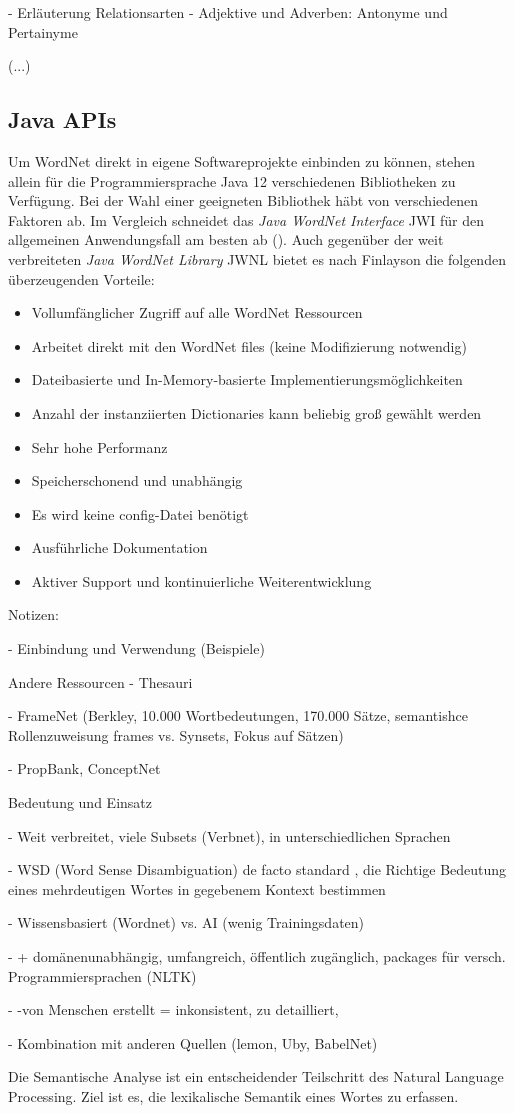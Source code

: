 - Erläuterung Relationsarten
- Adjektive und Adverben: Antonyme und Pertainyme

(...)

\subsection{Java APIs}

Um WordNet direkt in eigene Softwareprojekte einbinden zu können, stehen allein für die Programmiersprache Java 12 verschiedenen Bibliotheken zu Verfügung. Bei der Wahl einer geeigneten Bibliothek häbt von verschiedenen Faktoren ab. Im Vergleich schneidet das \textit{Java WordNet Interface} \ac{JWI} für den allgemeinen Anwendungsfall am besten ab (\cite[vgl.][2]{FINLAYSON}). Auch gegenüber der weit verbreiteten \textit{Java WordNet Library} \ac{JWNL} bietet es nach Finlayson die folgenden überzeugenden Vorteile:

\begin{itemize} 
\item Vollumfänglicher Zugriff auf alle WordNet Ressourcen
\item Arbeitet direkt mit den WordNet files (keine Modifizierung notwendig)
\item Dateibasierte und In-Memory-basierte Implementierungsmöglichkeiten
\item Anzahl der instanziierten Dictionaries kann beliebig groß gewählt werden
\item Sehr hohe Performanz
\item Speicherschonend und unabhängig
\item Es wird keine config-Datei benötigt 
\item Ausführliche Dokumentation
\item Aktiver Support und kontinuierliche Weiterentwicklung
\end{itemize}


Notizen:

- Einbindung und Verwendung (Beispiele)

Andere Ressourcen
-	Thesauri

-	FrameNet (Berkley, 10.000 Wortbedeutungen, 170.000
Sätze, semantishce Rollenzuweisung frames vs. Synsets, Fokus auf Sätzen)

-	PropBank, ConceptNet

Bedeutung und Einsatz

-	Weit verbreitet, viele Subsets (Verbnet), in unterschiedlichen Sprachen

-	WSD (Word Sense Disambiguation) de facto standard , die Richtige Bedeutung eines mehrdeutigen Wortes in gegebenem Kontext bestimmen

-	Wissensbasiert (Wordnet) vs. AI (wenig Trainingsdaten)

-	+ domänenunabhängig, umfangreich, öffentlich zugänglich, packages für versch. Programmiersprachen (NLTK)

-	-von Menschen erstellt = inkonsistent, zu detailliert,
 
-	Kombination mit anderen Quellen (lemon, Uby, BabelNet)


Die Semantische Analyse ist ein entscheidender Teilschritt des Natural Language Processing. Ziel ist es, die lexikalische Semantik eines Wortes zu erfassen.
